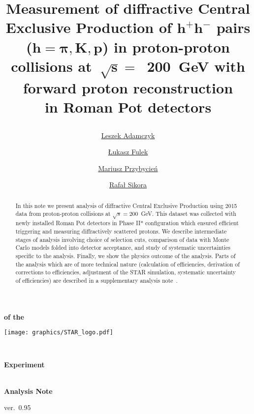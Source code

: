 \documentclass[a4paper,10pt,notitlepage]{report}
\title{%
\centering\hspace*{-0.08\linewidth}\begin{minipage}{1.16\linewidth}\centering%
\textbf{Measurement of diffractive Central Exclusive Production of $\bm{h^{+}h^{-}}$ pairs ($\bm{h=\pi,K,p}$) in proton-proton collisions at~$\bm{\sqrt{s}=}$~200~GeV with forward proton reconstruction\\in Roman Pot detectors}
\end{minipage}%
\vspace*{10pt}}
\author[ ]{\href{mailto:leszek.adamczyk@agh.edu.pl}{Leszek Adamczyk}}
\author[ ]{\href{mailto:lukasz.fulek@fis.agh.edu.pl}{Łukasz Fulek}}
\author[ ]{\href{mailto:mariusz.przybycien@agh.edu.pl}{Mariusz Przybycień}}
\author[ ]{\href{mailto:rafal.sikora@fis.agh.edu.pl}{Rafał Sikora}}
\affil[ ]{AGH University of Science and Technology, FPACS, Kraków, Poland}
\begin{document}
\begin{center}
\begin{minipage}[c]{0.12\linewidth}%
\vspace{5.5pt}\textbf{\LARGE{of the}}
\end{minipage}
\begin{minipage}[c]{0.15\linewidth}%
\hspace*{-8pt}\texttt{[image: graphics/STAR\_logo.pdf]}
\end{minipage}~
\begin{minipage}[c]{0.24\linewidth}%
\vspace{9pt}\hspace*{-8pt}\textbf{\LARGE{Experiment}}
\end{minipage}\\[-50pt]
\textbf{\LARGE{Analysis Note}}

\vspace*{150pt}
\begin{minipage}{\linewidth}
\maketitle
\begin{abstract}
In this note we present analysis of diffractive Central Exclusive Production using 2015 data from proton-proton collisions at $\sqrt{s}=200$~GeV. This dataset was collected with newly installed Roman Pot detectors in Phase II* configuration which ensured efficient triggering and measuring diffractively scattered protons. We describe intermediate stages of analysis involving choice of selection cuts, comparison of data with Monte Carlo models folded into detector acceptance, and study of systematic uncertainties specific to the analysis. Finally, we show the physics outcome of the analysis. Parts of the analysis which are of more technical nature (calculation of efficiencies, derivation of corrections to efficiencies, adjustment of the STAR simulation, systematic uncertainty of efficiencies) are described in a supplementary analysis note~\cite{supplementaryNote}.
\end{abstract}
\thispagestyle{empty}
\end{minipage}

\vspace{50pt}

ver.~0.95
\end{center}


\clearpage
\thispagestyle{empty}
\end{document}
